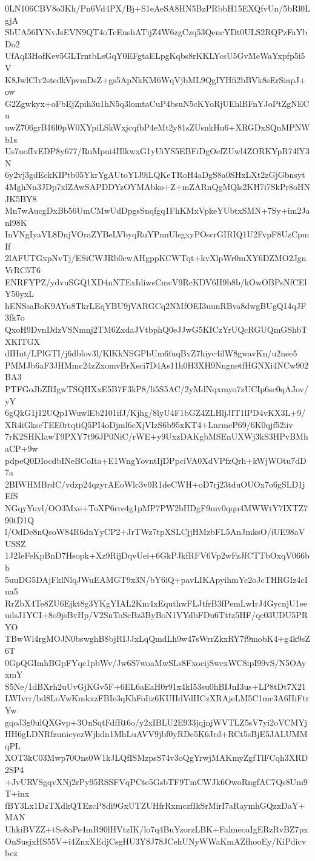 0LN106CBV8o3Kh/Pn6Vd4PX/Bj+S1eAeSA8HN5BzPRbbH15EXQfvUn/5bRl0LgjA
SbUA56IYNvJsEVN9QT4oTeEnshATijZ4W6zgCzq53QencYDt0ULS2RQPzFaYbDo2
UfAqI3HofKev5GLTrntbLsGqY0EFgtaELpgKqbs8rKKLYcsU5GvMeWaYxpfp5i5V
K8JwlCIv2stedkVpvmDsZ+gs5ApNkKM6WqVjbML9QgIYHfi2bBVk8sErSiapJ+ow
G2Zgwkyx+oFbEjZpih3u1hN5q3lomtaCuP4bsuN5cKYoRjUEhlBFnYJoPtZgNECu
uwZ706grB16l0pW0XYpiLSkWxjcqfbP4eMt2y81sZUsnkHu6+XRGDxSQnMPNWb1s
Us7uofIvEDP8y677/RuMpui4HlkwxG1yUiYS5EBFiDgOefZUwl4ZORKYpR74lY3N
6y2vj3gdEckKIPtb05YkrYgAUtoYIJ9iLQKeTRoH4aDgS8a0SHxLXt2zGjGbnsyt
4MghNn3JDp7xlZAwSAPDDYzOYMAbko+Z+mZARnQgMQls2KH7i7SkPr8oHNJK5BY8
Mn7wAucgDxBb56UmCMwUdDpgsSnqfgq1FhKMxVpkeYUbtxSMN+7Sy+im2Janl98K
IuVNgIyaVL8DnjVOraZYBeLVbyqRuYPnnUlsgxyPOscrGIRIQ1U2FvpF8UzCpmIf
2lAFUTGxpNvTj/ESiCWJRb0cwAHgppKCWTqt+kvXlpWr0mXY6DZMO2JgnVrRC5T6
ENRFYPZ/ydvuSGQ1XD4nNTExIdiwsCmcV9RcKDV6H9b8b/kOwOBPsNfCElY56yxL
hENSsaBoK9AYu8TkrLEqYBU9jVARGCq2NMfOEI3uunRBva8dwgBUgQ14qJF3fk7o
QxoH9DvnDdzVSNmnj2TM6ZxdaJVtbphQ0eJJwG5KICzYrUQcRGUQmGShbTXKITGX
dIHut/LPlGTI/j6dblov3l/KlKkNSGPbUm6fuqBvZ7hiyc4ilW8gwavKn/u2nee5
PMMJb6aF3JHMmc24zZxomvBrXsci7D4As11h0H3XH9NngnetfHGNXi4NCw902BA3
PTFGoJbZRIgwTSQHXxE5B7F3kP8/li5S5AC/2yMdNqxmyo7zUCIp6sc0qAJov/yY
6gQkG1j12UQp1WuwlEb2101ifJ/Kjhg/8lyU4F1bGZ4ZLHljJIT1lPD4vKX3L+9/
XR4iGkscTEE0rtqtiQ5PI4oDjml6cXjVIzS6b95xKT4+LnrmeP69/6K0qjf52iiv
7rK2SHKIawT9PXY7t96JP0NiC/rWE+y9UxzDAKgbMSEnUXWj3kS3HPvBMhaCP+9w
pdpeQ0DIocdbINeBCoIta+E1WngYovntIjDPpciVA0XdVPfzQrh+kWjWOtu7dD7a
2BIWHMBrdC/vdzp24qzyrAEoWlc3v0R1deCWH+oD7rj23tduOUOx7o6gSLD1jEfS
NGqyYuvl/OO3Mxe+ToXP6rre4g1pMP7PW2bHDgF9mv0qqn4MWWtY7IXTZ790tD1Q
l/OdDe8nQsoW84R6dnYyCP2+JrTWz7tpXSLCjjHMzbFL5AnJmksO/iUE98aVUSSZ
1J2IeFeKpBnD7Hsopk+Xz9RijDqvUei+6GkPJkfRFV6Vp2wFzJfCTTbOxqV066bb
5uuDG5DAjFklNlqJWuEAMGT9x3N/bY6iQ+pavLIKApyihmYc2oJcTHRGIz4cIua5
RrZbX4Te8ZU6Ejkt8g3YKgYIAL2Km4xEquthwFLJtfrB3fPemLwIrJ4GycnjU1ee
udsJ1YCI+8o9jsBvHp/V2SnToScBz3ByBoN1VYdbFDu6Tttz5HF/qc03UDU5PRYO
TBwWl4rgMOJN0bswghB8bjRIJJxLqQmdLh9w47sWrrZkxRY7f9mobK4+g4k9sZ6T
0GpQGImhBGpFYqc1pbWv/Jw6S7woaMwSLs8FxoeijSwcxWC8ipI99vS/N5OAyxmY
S5Ne/1dBXrh2uUvGjKGv5F+6EL6aEaH0r91x4kI53su0hBIJnI3us+LP8tDt7X21
LWIvrr/bd8LoVwKmkxzFBIe3qKhFoIiz6KUHdVdHCzXRAjeLM5C1mc3A6HiFtrYw
gqoJ3g0ulQXGvp+3OnSqtFdfRt6o/y2xIBLU2E933jqjnjWVTLZ5sV7yi2oVCMYj
HH6gLDNRfzunicyezWjhdn1MhLuAVV9jbf0yRDe5K6Jrd+RCt5sBjE5JALUMMqPL
XOT3kC03Mwp70Ons0W1kJLQfISMzpsS74v3oQgYrwjMAKmyZgfTlFCqh3XRD2SP4
+JvURVSgqvXNj2rPy95RSSFVqPCte5GsbTF9TmCWJk6OwoRngfAC7Qs8Um9T+inx
fBY3Lx1DzTXdkQTEzcP8di9GxUTZUHfrRxmczfIkSrMirI7aRaymhGQzxDaY+MAN
UhkiBVZZ+tSe8aPe4mR90lHVtzIK/lo7q4BuYzorzLBK+FalmeoaIgERzRvBZ7px
OnSusjxHS55V+i4ZnxXEdjCsgHU3Y8J78JCehUNyWWaKmAZfhooEy/KiPdicvbcz

